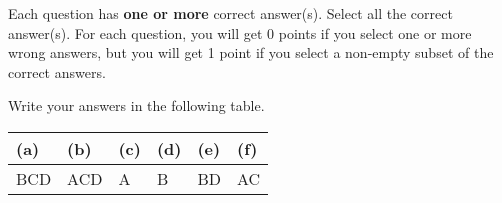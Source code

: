 
Each question has \textbf{one or more} correct answer(s). Select all the correct answer(s). For each question, you will get 0 points if you select one or more wrong answers, but you will get 1 point if you select a non-empty subset of the correct answers.

Write your answers in the following table.


\begin{table}[htbp]
    \centering
    \begin{tabular}{|p{2cm}|p{2cm}|p{2cm}|p{2cm}|p{2cm}|p{2cm}|}
        \hline
        (a) & (b) & (c) & (d) & (e) & (f) \\
        \hline
        BCD & ACD & A   & B   & BD  & AC  \\
        \hline
    \end{tabular}
\end{table}

